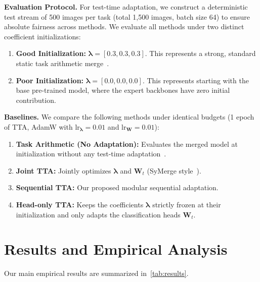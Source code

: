 \documentclass{article}
\theoremstyle{plain}
\theoremstyle{definition}
\theoremstyle{remark}
\begin{document}
\textbf{Evaluation Protocol.} For test-time adaptation, we construct a deterministic test stream of 500 images per task (total 1,500 images, batch size 64) to ensure absolute fairness across methods. We evaluate all methods under two distinct coefficient initializations:
\begin{enumerate}
    \item \textbf{Good Initialization:} $\boldsymbol{\lambda} = [0.3, 0.3, 0.3]$. This represents a strong, standard static task arithmetic merge~\cite{ilharco2023editing}.
    \item \textbf{Poor Initialization:} $\boldsymbol{\lambda} = [0.0, 0.0, 0.0]$. This represents starting with the base pre-trained model, where the expert backbones have zero initial contribution.
\end{enumerate}

\textbf{Baselines.} We compare the following methods under identical budgets (1 epoch of TTA, AdamW with $\text{lr}_{\boldsymbol{\lambda}} = 0.01$ and $\text{lr}_{\mathbf{W}} = 0.01$):
\begin{enumerate}
    \item \textbf{Task Arithmetic (No Adaptation):} Evaluates the merged model at initialization without any test-time adaptation~\cite{ilharco2023editing}.
    \item \textbf{Joint TTA:} Jointly optimizes $\boldsymbol{\lambda}$ and $\mathbf{W}_t$ (SyMerge style~\cite{symerge}).
    \item \textbf{Sequential TTA:} Our proposed modular sequential adaptation.
    \item \textbf{Head-only TTA:} Keeps the coefficients $\boldsymbol{\lambda}$ strictly frozen at their initialization and only adapts the classification heads $\mathbf{W}_t$.
\end{enumerate}


\section{Results and Empirical Analysis}
\label{sec:results}

Our main empirical results are summarized in~\cref{tab:results}.
\end{document}
